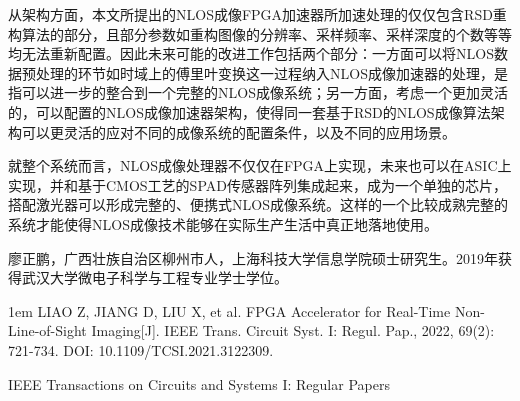 \documentclass[master]{shtthesis}             %
\makeatletter
\def\ifgraduate{\ifsht@graduate}
\makeatother
\begin{document}
从架构方面，本文所提出的NLOS成像FPGA加速器所加速处理的仅仅包含RSD重构算法的部分，且部分参数如重构图像的分辨率、采样频率、采样深度的个数等等均无法重新配置。因此未来可能的改进工作包括两个部分：一方面可以将NLOS数据预处理的环节如时域上的傅里叶变换这一过程纳入NLOS成像加速器的处理，是指可以进一步的整合到一个完整的NLOS成像系统；另一方面，考虑一个更加灵活的，可以配置的NLOS成像加速器架构，使得同一套基于RSD的NLOS成像算法架构可以更灵活的应对不同的成像系统的配置条件，以及不同的应用场景。

就整个系统而言，NLOS成像处理器不仅仅在FPGA上实现，未来也可以在ASIC上实现，并和基于CMOS工艺的SPAD传感器阵列集成起来，成为一个单独的芯片，搭配激光器可以形成完整的、便携式NLOS成像系统。这样的一个比较成熟完整的系统才能使得NLOS成像技术能够在实际生产生活中真正地落地使用。%

\makebiblio


\backmatter
\begin{acknowledgement}
\end{acknowledgement}

\ifgraduate
\begin{resume}
  廖正鹏，广西壮族自治区柳州市人，上海科技大学信息学院硕士研究生。2019年获得武汉大学微电子科学与工程专业学士学位。
\end{resume}

\begin{publications}
  \hangindent 1em
  \noindent
  LIAO Z, JIANG D, LIU X, et al. FPGA Accelerator for Real-Time Non-Line-of-Sight Imaging[J]. IEEE Trans. Circuit Syst. I: Regul. Pap., 2022, 69(2): 721-734. DOI: 10.1109/TCSI.2021.3122309.

\end{publications}

\begin{publications*}
  IEEE Transactions on Circuits and Systems I: Regular Papers
\end{publications*}



\fi
\end{document}
